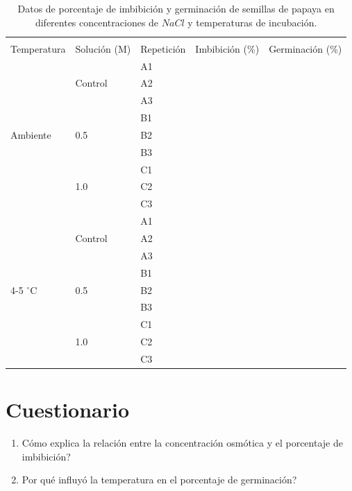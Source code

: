 \begin{table}[h!]
	\caption{Datos de porcentaje de imbibici\'on y germinaci\'on de semillas de papaya en diferentes concentraciones de $NaCl$ y temperaturas de incubaci\'on.}
	
	\label{resultados:germinacion}
	\centering
	\begin{tabular}{p{} p{} p{} p{} p{}}
		
		\hline  &&&& \\
		Temperatura & Soluci\'on (M) & Repetici\'on & Imbibici\'on (\%) & Germinaci\'on (\%) \\
		\hline 
		
		\multirow{9}{*}{Ambiente}& \multirow{3}{*}{Control} & A1 & & \\ 
														   & & A2 & & \\
														   & & A3 & & \\
														   \cline{2-5}
														   
								 & \multirow{3}{*}{0.5}		 & B1 & & \\
															 &&B2&& \\
															 &&B3&& \\
															\cline{2-5} 
		 &\multirow{3}{*}{1.0}& C1 && \\
		&&C2&& \\
		 &&C3&& \\
		
		\hline 
		\multirow{9}{*}{4-5 $^\circ$C}& \multirow{3}{*}{Control} & A1 & & \\ 
		& & A2 & & \\
		& & A3 & & \\
		\cline{2-5} 
		& \multirow{3}{*}{0.5}		 & B1 & & \\
		&&B2&& \\
		&&B3&& \\
		\cline{2-5} 
		&\multirow{3}{*}{1.0}& C1 && \\
		&&C2&& \\
		&&C3&& \\
		
		\hline 
					
	\end{tabular}
\end{table}



\section{Cuestionario}

\begin{enumerate}
	\item \textquestiondown C\'omo explica la relaci\'on entre la concentraci\'on osm\'otica y el porcentaje de imbibici\'on?
	\item \textquestiondown Por qu\'e influy\'o la temperatura en el porcentaje de germinaci\'on?
	
\end{enumerate}
